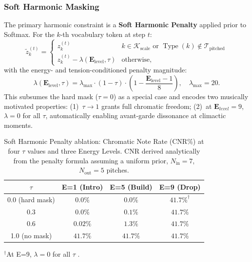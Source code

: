 \documentclass[conference]{IEEEtran}
\begin{document}
\subsubsection*{Soft Harmonic Masking}
\label{sec:soft_mask}
The primary harmonic constraint is a \textbf{Soft Harmonic Penalty} applied prior to Softmax. For the $k$-th vocabulary token at step $t$:
\begin{equation}
\tilde{z}_k^{(t)} =
\begin{cases}
z_k^{(t)} & k\in\mathcal{K}_{\text{scale}}\text{ or }\operatorname{Type}(k)\notin\mathcal{T}_{\text{pitched}} \\[3pt]
z_k^{(t)} - \lambda(\mathbf{E}_{\text{level}},\tau) & \text{otherwise,}
\end{cases}
\end{equation}
with the energy- and tension-conditioned penalty magnitude:
\begin{equation}
\lambda(\mathbf{E}_{\text{level}},\tau) =
  \lambda_{\max}\cdot(1-\tau)\cdot
  \left(1-\frac{\mathbf{E}_{\text{level}}-1}{8}\right), \quad \lambda_{\max}=20.
\end{equation}
This subsumes the hard mask ($\tau=0$) as a special case and encodes two musically motivated properties: (1)~$\tau\to 1$ grants full chromatic freedom; (2)~at $\mathbf{E}_{level}=9$, $\lambda=0$ for all $\tau$, automatically enabling avant-garde dissonance at climactic moments.

\begin{table}[ht]
\centering\small
\caption{Soft Harmonic Penalty ablation: Chromatic Note Rate
         (CNR\%) at four $\tau$ values and three Energy Levels.
         CNR derived analytically from the penalty formula assuming a
         uniform prior, $N_{\text{in}}=7$, $N_{\text{out}}=5$ pitches.}
\label{tab:shp}
\begin{tabular}{@{}cccc@{}}
\toprule
$\tau$ & \textbf{E=1 (Intro)} & \textbf{E=5 (Build)} & \textbf{E=9 (Drop)} \\ \midrule
0.0 (hard mask) & $0.0\%$             & $0.0\%$              & $\mathbf{41.7\%}^{\dagger}$ \\
0.3             & $0.0\%$             & $0.1\%$              & $41.7\%$ \\
0.6             & $0.02\%$            & $1.3\%$              & $41.7\%$ \\
1.0 (no mask)   & $41.7\%$            & $41.7\%$             & $41.7\%$ \\ \bottomrule
\end{tabular}
\vspace{2pt}
{\scriptsize $^{\dagger}$At E=9, $\lambda=0$ for all $\tau$ .}
\end{table}
\end{document}
